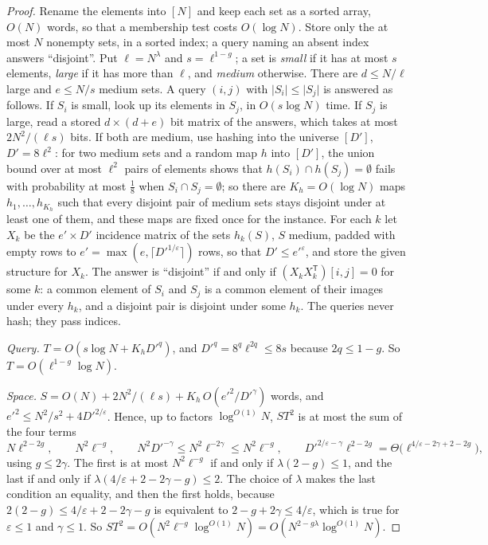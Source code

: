 \documentclass[11pt]{article}
\theoremstyle{definition}
\theoremstyle{remark}
\providecommand{\eps}{\varepsilon}
\newcommand{\abs}[1]{\lvert #1\rvert}
\begin{document}
\begin{proof}
Rename the elements into $[N]$ and keep each set as a sorted array, $O(N)$ words, so that a membership test costs $O(\log N)$. Store only the at most $N$ nonempty sets, in a sorted index; a query naming an absent index answers ``disjoint''. Put $\ell=N^\lambda$ and $s=\ell^{1-g}$; a set is \emph{small} if it has at most $s$ elements, \emph{large} if it has more than $\ell$, and \emph{medium} otherwise. There are $d\le N/\ell$ large and $e\le N/s$ medium sets. A query $(i,j)$ with $\abs{S_i}\le\abs{S_j}$ is answered as follows. If $S_i$ is small, look up its elements in $S_j$, in $O(s\log N)$ time. If $S_j$ is large, read a stored $d\times(d+e)$ bit matrix of the answers, which takes at most $2N^2/(\ell s)$ bits. If both are medium, use hashing into the universe $[D']$, $D'=8\ell^2$: for two medium sets and a random map $h$ into $[D']$, the union bound over at most $\ell^2$ pairs of elements shows that $h(S_i)\cap h(S_j)=\emptyset$ fails with probability at most $\frac18$ when $S_i\cap S_j=\emptyset$; so there are $K_h=O(\log N)$ maps $h_1,\dots,h_{K_h}$ such that every disjoint pair of medium sets stays disjoint under at least one of them, and these maps are fixed once for the instance. For each $k$ let $X_k$ be the $e'\times D'$ incidence matrix of the sets $h_k(S)$, $S$ medium, padded with empty rows to $e'=\max(e,\lceil D'^{1/\eps}\rceil)$ rows, so that $D'\le e'^\eps$, and store the given structure for $X_k$. The answer is ``disjoint'' if and only if $(X_kX_k^{\mathsf T})[i,j]=0$ for some $k$: a common element of $S_i$ and $S_j$ is a common element of their images under every $h_k$, and a disjoint pair is disjoint under some $h_k$. The queries never hash; they pass indices.

\emph{Query.} $T=O(s\log N+K_hD'^q)$, and $D'^q=8^q\ell^{2q}\le8s$ because $2q\le1-g$. So $T=O(\ell^{1-g}\log N)$.

\emph{Space.} $S=O(N)+2N^2/(\ell s)+K_h\,O(e'^2/D'^\gamma)$ words, and $e'^2\le N^2/s^2+4D'^{2/\eps}$. Hence, up to factors $\log^{O(1)}N$, $ST^2$ is at most the sum of the four terms
\[
N\ell^{2-2g},\qquad N^2\ell^{-g},\qquad N^2D'^{-\gamma}\le N^2\ell^{-2\gamma}\le N^2\ell^{-g},\qquad D'^{2/\eps-\gamma}\ell^{2-2g}=\Theta\bigl(\ell^{4/\eps-2\gamma+2-2g}\bigr),
\]
using $g\le2\gamma$. The first is at most $N^2\ell^{-g}$ if and only if $\lambda(2-g)\le1$, and the last if and only if $\lambda(4/\eps+2-2\gamma-g)\le2$. The choice of $\lambda$ makes the last condition an equality, and then the first holds, because $2(2-g)\le4/\eps+2-2\gamma-g$ is equivalent to $2-g+2\gamma\le4/\eps$, which is true for $\eps\le1$ and $\gamma\le1$. So $ST^2=O(N^2\ell^{-g}\log^{O(1)}N)=O(N^{2-g\lambda}\log^{O(1)}N)$.
\end{proof}
\end{document}
